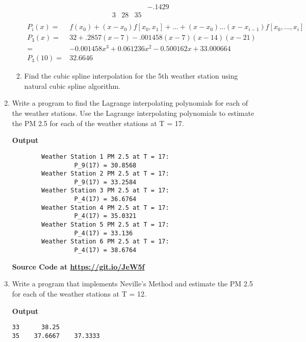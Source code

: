 \documentclass{exam}
\begin{document}
\begin{enumerate}
\begin{enumerate}
\begin{equation*}
\begin{array}{cccccc}
                  &     &       & -.1429\\
                3 & 28  & 35\\
            \end{array}
        \end{equation*}
        \begin{align*}
            P_i(x)=&f(x_0)+(x-x_0)f[x_0,x_1]+...+(x-x_0)...(x-x_{i-1})f[x_0,...,x_i]\\
            P_3(x)=&32 + .2857(x-7) - .001458(x-7)(x-14)(x-21)\\
            =&-0.001458x^3+0.061236x^2-0.500162x+33.000664\\
            P_3(10)=&\mathbf{32.6646}
        \end{align*}
        \newpage
        \item Find the cubic spline interpolation for the 5th weather station using natural cubic spline algorithm.
    \end{enumerate}
    \newpage
    \item  Write a program to find the Lagrange interpolating polynomials for each of the weather stations. Use the Lagrange interpolating polynomials to estimate the PM 2.5 for each of the weather stations at T = 17.
    \begin{center}
        \textbf{Output}
    \end{center}
    \begin{verbatim}
        Weather Station 1 PM 2.5 at T = 17:
                 P_9(17) = 30.8568
        Weather Station 2 PM 2.5 at T = 17:
                 P_9(17) = 33.2584
        Weather Station 3 PM 2.5 at T = 17:
                 P_4(17) = 36.6764
        Weather Station 4 PM 2.5 at T = 17:
                 P_4(17) = 35.0321
        Weather Station 5 PM 2.5 at T = 17:
                 P_4(17) = 33.136
        Weather Station 6 PM 2.5 at T = 17:
                 P_4(17) = 38.6764
    \end{verbatim}
    \begin{center}
        \textbf{Source Code at \url{https://git.io/JeW5f}}
    \end{center}
    \newpage
	\item  Write a program that implements Neville's Method and estimate the PM 2.5 for each of the weather stations at T = 12.
    \begin{center}
        \textbf{Output}
    \end{center}
    \begin{verbatim}
33      38.25
35    37.6667    37.3333

\end{verbatim}
\end{enumerate}
\end{document}
